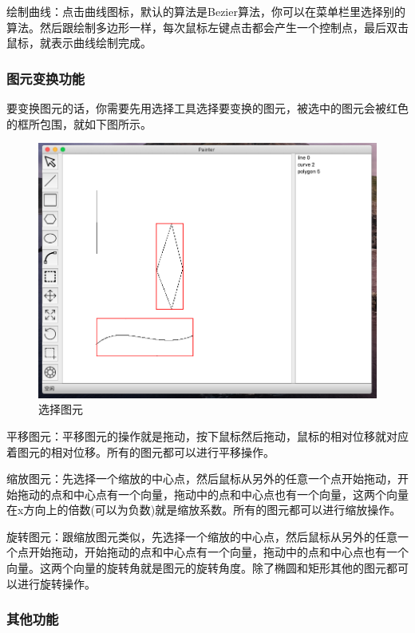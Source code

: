 \documentclass[a4paper,UTF8]{article}
\theoremstyle{definition}
\begin{document}
绘制曲线：点击曲线图标，默认的算法是Bezier算法，你可以在菜单栏里选择别的算法。然后跟绘制多边形一样，每次鼠标左键点击都会产生一个控制点，最后双击鼠标，就表示曲线绘制完成。

\subsubsection{图元变换功能}

要变换图元的话，你需要先用选择工具选择要变换的图元，被选中的图元会被红色的框所包围，就如下图所示。

\begin{figure}[H]
    \centering
    \includegraphics[scale=0.5]{select.png}
    \caption{选择图元}
\end{figure}

平移图元：平移图元的操作就是拖动，按下鼠标然后拖动，鼠标的相对位移就对应着图元的相对位移。所有的图元都可以进行平移操作。

缩放图元：先选择一个缩放的中心点，然后鼠标从另外的任意一个点开始拖动，开始拖动的点和中心点有一个向量，拖动中的点和中心点也有一个向量，这两个向量在x方向上的倍数(可以为负数)就是缩放系数。所有的图元都可以进行缩放操作。

旋转图元：跟缩放图元类似，先选择一个缩放的中心点，然后鼠标从另外的任意一个点开始拖动，开始拖动的点和中心点有一个向量，拖动中的点和中心点也有一个向量。这两个向量的旋转角就是图元的旋转角度。除了椭圆和矩形其他的图元都可以进行旋转操作。


\subsubsection{其他功能}
\end{document}
